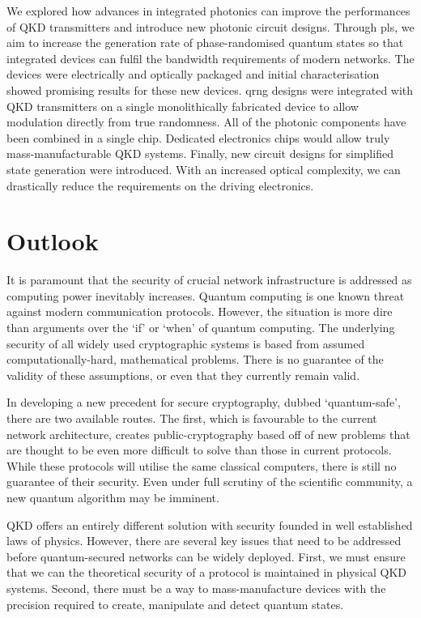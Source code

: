 We explored how advances in integrated photonics can improve the performances of \ac{QKD} transmitters and introduce new photonic circuit designs. Through \ac{pls}, we aim to increase the generation rate of phase-randomised quantum states so that integrated devices can fulfil the bandwidth requirements of modern networks. The devices were electrically and optically packaged and initial characterisation showed promising results for these new devices. \Ac{qrng} designs were integrated with \ac{QKD} transmitters on a single monolithically fabricated device to allow modulation directly from true randomness. All of the photonic components have been combined in a single chip. Dedicated electronics chips would allow truly mass-manufacturable \ac{QKD} systems. Finally, new circuit designs for simplified state generation were introduced. With an increased optical complexity, we can drastically reduce the requirements on the driving electronics.

\clearpage
\newpage
\section{Outlook}

It is paramount that the security of crucial network infrastructure is addressed as computing power inevitably increases. Quantum computing is one known threat against modern communication protocols. However, the situation is more dire than arguments over the `if' or `when' of quantum computing. The underlying security of all widely used cryptographic systems is based from assumed computationally-hard, mathematical problems. There is no guarantee of the validity of these assumptions, or even that they currently remain valid.

In developing a new precedent for secure cryptography, dubbed `quantum-safe', there are two available routes. The first, which is favourable to the current network architecture, creates public-cryptography based off of new problems that are thought to be even more difficult to solve than those in current protocols. While these protocols will utilise the same classical computers, there is still no guarantee of their security. Even under full scrutiny of the scientific community, a new quantum algorithm may be imminent. 

\Ac{QKD} offers an entirely different solution with security founded in well established laws of physics. However, there are several key issues that need to be addressed before quantum-secured networks can be widely deployed. First, we must ensure that we can the theoretical security of a protocol is maintained in physical \ac{QKD} systems. Second, there must be a way to mass-manufacture devices with the precision required to create, manipulate and detect quantum states. 

